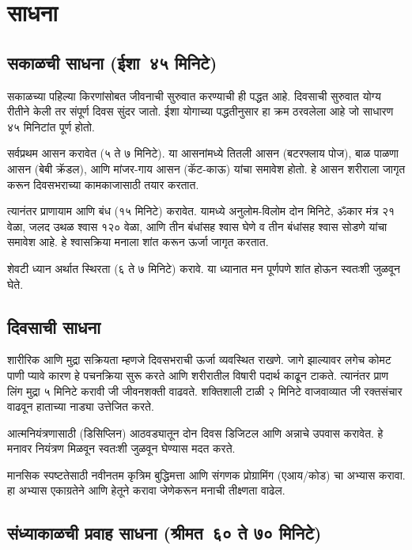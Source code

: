 \chapter*{साधना}


\section*{सकाळची साधना (ईशा~४५ मिनिटे)}

सकाळच्या पहिल्या किरणांसोबत जीवनाची सुरुवात करण्याची ही पद्धत आहे. दिवसाची सुरुवात योग्य रीतीने केली तर संपूर्ण दिवस सुंदर जातो. ईशा योगाच्या पद्धतीनुसार हा क्रम ठरवलेला आहे जो साधारण ४५ मिनिटांत पूर्ण होतो.

सर्वप्रथम आसन करावेत (५ ते ७ मिनिटे). या आसनांमध्ये तितली आसन (बटरफ्लाय पोज), बाळ पाळणा आसन (बेबी क्रॅडल), आणि मांजर-गाय आसन (कॅट-काऊ) यांचा समावेश होतो. हे आसन शरीराला जागृत करून दिवसभराच्या कामकाजासाठी तयार करतात.

त्यानंतर प्राणायाम आणि बंध (१५ मिनिटे) करावेत. यामध्ये अनुलोम-विलोम दोन मिनिटे, ॐकार मंत्र २१ वेळा, जलद उथळ श्वास १२० वेळा, आणि तीन बंधांसह श्वास घेणे व तीन बंधांसह श्वास सोडणे यांचा समावेश आहे. हे श्वासक्रिया मनाला शांत करून ऊर्जा जागृत करतात.

शेवटी ध्यान अर्थात स्थिरता (६ ते ७ मिनिटे) करावे. या ध्यानात मन पूर्णपणे शांत होऊन स्वतःशी जुळवून घेते.

\section*{दिवसाची साधना}

शारीरिक आणि मुद्रा सक्रियता म्हणजे दिवसभराची ऊर्जा व्यवस्थित राखणे. जागे झाल्यावर लगेच कोमट पाणी प्यावे कारण हे पचनक्रिया सुरू करते आणि शरीरातील विषारी पदार्थ काढून टाकते. त्यानंतर प्राण लिंग मुद्रा ५ मिनिटे करावी जी जीवनशक्ती वाढवते. शक्तिशाली टाळी २ मिनिटे वाजवाव्यात जी रक्तसंचार वाढवून हाताच्या नाड्या उत्तेजित करते.

आत्मनियंत्रणासाठी (डिसिप्लिन) आठवड्यातून दोन दिवस डिजिटल आणि अन्नाचे उपवास करावेत. हे मनावर नियंत्रण मिळवून स्वतःशी जुळवून घेण्यास मदत करते.

मानसिक स्पष्टतेसाठी नवीनतम कृत्रिम बुद्धिमत्ता आणि संगणक प्रोग्रामिंग (एआय/कोड) चा अभ्यास करावा. हा अभ्यास एकाग्रतेने आणि हेतूने करावा जेणेकरून मनाची तीक्ष्णता वाढेल.

\section*{संध्याकाळची प्रवाह साधना (श्रीमत~६० ते ७० मिनिटे)}

